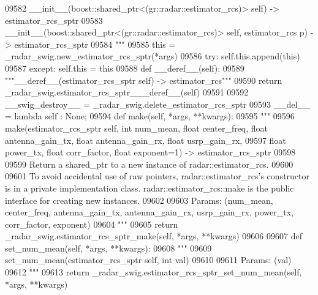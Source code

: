 \begin{DoxyCode}
{{{{{{{{{{{{{{{{{{{{{{{{{{{{{{{09582 \textcolor{stringliteral}{        \_\_init\_\_(boost::shared\_ptr<(gr::radar::estimator\_rcs)> self) -> estimator\_rcs\_sptr}
09583 \textcolor{stringliteral}{        \_\_init\_\_(boost::shared\_ptr<(gr::radar::estimator\_rcs)> self, estimator\_rcs p) -> estimator\_rcs\_sptr}
09584 \textcolor{stringliteral}{        """}
09585         this = \_radar\_swig.new\_estimator\_rcs\_sptr(*args)
09586         \textcolor{keywordflow}{try}: self.this.append(this)
09587         \textcolor{keywordflow}{except}: self.this = this
09588     \textcolor{keyword}{def }__deref__(self):
09589         \textcolor{stringliteral}{"""\_\_deref\_\_(estimator\_rcs\_sptr self) -> estimator\_rcs"""}
09590         \textcolor{keywordflow}{return} \_radar\_swig.estimator\_rcs\_sptr\_\_\_deref\_\_(self)
09591 
09592     \_\_swig\_destroy\_\_ = \_radar\_swig.delete\_estimator\_rcs\_sptr
09593     \_\_del\_\_ = \textcolor{keyword}{lambda} self : \textcolor{keywordtype}{None};
09594     \textcolor{keyword}{def }make(self, *args, **kwargs):
09595         \textcolor{stringliteral}{"""}
09596 \textcolor{stringliteral}{        make(estimator\_rcs\_sptr self, int num\_mean, float center\_freq, float antenna\_gain\_tx, float
       antenna\_gain\_rx, float usrp\_gain\_rx, }
09597 \textcolor{stringliteral}{            float power\_tx, float corr\_factor, float exponent=1) -> estimator\_rcs\_sptr}
09598 \textcolor{stringliteral}{}
09599 \textcolor{stringliteral}{        Return a shared\_ptr to a new instance of radar::estimator\_rcs.}
09600 \textcolor{stringliteral}{}
09601 \textcolor{stringliteral}{        To avoid accidental use of raw pointers, radar::estimator\_rcs's constructor is in a private
       implementation class. radar::estimator\_rcs::make is the public interface for creating new instances.}
09602 \textcolor{stringliteral}{}
09603 \textcolor{stringliteral}{        Params: (num\_mean, center\_freq, antenna\_gain\_tx, antenna\_gain\_rx, usrp\_gain\_rx, power\_tx,
       corr\_factor, exponent)}
09604 \textcolor{stringliteral}{        """}
09605         \textcolor{keywordflow}{return} \_radar\_swig.estimator\_rcs\_sptr\_make(self, *args, **kwargs)
09606 
09607     \textcolor{keyword}{def }set_num_mean(self, *args, **kwargs):
09608         \textcolor{stringliteral}{"""}
09609 \textcolor{stringliteral}{        set\_num\_mean(estimator\_rcs\_sptr self, int val)}
09610 \textcolor{stringliteral}{}
09611 \textcolor{stringliteral}{        Params: (val)}
09612 \textcolor{stringliteral}{        """}
09613         \textcolor{keywordflow}{return} \_radar\_swig.estimator\_rcs\_sptr\_set\_num\_mean(self, *args, **kwargs)
}}}}}}}}}}}}}}}}}}}}}}}}}}}}}}}
\end{DoxyCode}
